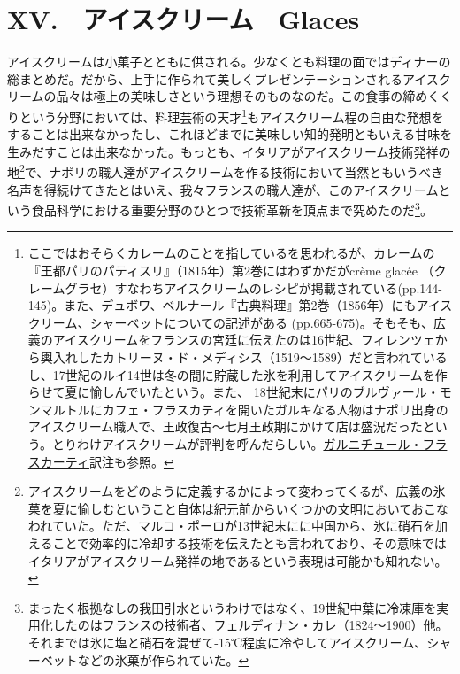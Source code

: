\hypertarget{xv.ux30a2ux30a4ux30b9ux30afux30eaux30fcux30e0glaces}{%
\chapter{XV.　アイスクリーム　Glaces}\label{xv.ux30a2ux30a4ux30b9ux30afux30eaux30fcux30e0glaces}}

 

アイスクリームは小菓子とともに供される。少なくとも料理の面ではディナーの総まとめだ。だから、上手に作られて美しくプレゼンテーションされるアイスクリームの品々は極上の美味しさという理想そのものなのだ。この食事の締めくくりという分野においては、料理芸術の天才\footnote{ここではおそらくカレームのことを指しているを思われるが、カレームの『王都パリのパティスリ』（1815年）第2巻にはわずかだがcrème
  glacée
  （クレームグラセ）すなわちアイスクリームのレシピが掲載されている(pp.144-145)。また、デュボワ、ベルナール『古典料理』第2巻（1856年）にもアイスクリーム、シャーベットについての記述がある
  (pp.665-675)。そもそも、広義のアイスクリームをフランスの宮廷に伝えたのは16世紀、フィレンツェから輿入れしたカトリーヌ・ド・メディシス（1519〜1589）だと言われているし、17世紀のルイ14世は冬の間に貯蔵した氷を利用してアイスクリームを作らせて夏に愉しんでいたという。また、
  18世紀末にパリのブルヴァール・モンマルトルにカフェ・フラスカティを開いたガルキなる人物はナポリ出身のアイスクリーム職人で、王政復古〜七月王政期にかけて店は盛況だったという。とりわけアイスクリームが評判を呼んだらしい。\protect\hyperlink{garniture-frascati}{ガルニチュール・フラスカーティ}訳注も参照。}もアイスクリーム程の自由な発想をすることは出来なかったし、これほどまでに美味しい知的発明ともいえる甘味を生みだすことは出来なかった。もっとも、イタリアがアイスクリーム技術発祥の地\footnote{アイスクリームをどのように定義するかによって変わってくるが、広義の氷菓を夏に愉しむということ自体は紀元前からいくつかの文明においておこなわれていた。ただ、マルコ・ポーロが13世紀末にに中国から、氷に硝石を加えることで効率的に冷却する技術を伝えたとも言われており、その意味ではイタリアがアイスクリーム発祥の地であるという表現は可能かも知れない。}で、ナポリの職人達がアイスクリームを作る技術において当然ともいうべき名声を得続けてきたとはいえ、我々フランスの職人達が、このアイスクリームという食品科学における重要分野のひとつで技術革新を頂点まで究めたのだ\footnote{まったく根拠なしの我田引水というわけではなく、19世紀中葉に冷凍庫を実用化したのはフランスの技術者、フェルディナン・カレ（1824〜1900）他。それまでは氷に塩と硝石を混ぜて-15℃程度に冷やしてアイスクリーム、シャーベットなどの氷菓が作られていた。}。
